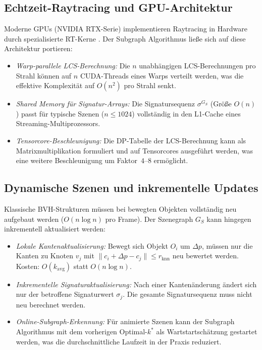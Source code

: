 ﻿\documentclass[a4paper,12pt]{article}
\theoremstyle{definition}
\begin{document}
\subsection{Echtzeit-Raytracing und GPU-Architektur}

Moderne GPUs (NVIDIA RTX-Serie) implementieren Raytracing in
Hardware durch spezialisierte RT-Kerne \citep{Parker2010}.
Der Subgraph Algorithmus ließe sich auf diese Architektur
portieren:

\begin{itemize}
  \item \emph{Warp-parallele LCS-Berechnung:} Die $n$ unabhängigen
        LCS-Berechnungen pro Strahl können auf $n$ CUDA-Threads
        eines Warps verteilt werden, was die effektive Komplexität
        auf $O(n^2)$ pro Strahl senkt.
  \item \emph{Shared Memory für Signatur-Arrays:} Die Signatursequenz
        $\sigma^{G_S}$ (Größe $O(n)$) passt für typische Szenen
        ($n \leq 1024$) vollständig in den L1-Cache eines
        Streaming-Multiprozessors.
  \item \emph{Tensorcore-Beschleunigung:} Die DP-Tabelle der
        LCS-Berechnung kann als Matrixmultiplikation formuliert
        und auf Tensorcores ausgeführt werden, was eine weitere
        Beschleunigung um Faktor~$4$--$8$ ermöglicht.
\end{itemize}

\subsection{Dynamische Szenen und inkrementelle Updates}

Klassische BVH-Strukturen müssen bei bewegten Objekten vollständig
neu aufgebaut werden ($O(n \log n)$ pro Frame). Der Szenegraph $G_S$
kann hingegen inkrementell aktualisiert werden:

\begin{itemize}
  \item \emph{Lokale Kantenaktualisierung:} Bewegt sich Objekt $O_i$
        um $\Delta p$, müssen nur die Kanten zu Knoten $v_j$ mit
        $\|c_i + \Delta p - c_j\| \leq r_{\mathrm{knn}}$ neu
        bewertet werden. Kosten: $O(k_{\mathrm{avg}})$ statt
        $O(n \log n)$.
  \item \emph{Inkrementelle Signaturaktualisierung:} Nach einer
        Kantenänderung ändert sich nur der betroffene Signaturwert
        $\sigma_j$. Die gesamte Signatursequenz muss nicht neu
        berechnet werden.
  \item \emph{Online-Subgraph-Erkennung:} Für animierte Szenen
        kann der Subgraph Algorithmus mit dem vorherigen
        Optimal-$k^*$ als Wartstartschätzung gestartet werden,
        was die durchschnittliche Laufzeit in der Praxis
        reduziert.
\end{itemize}
\end{document}
